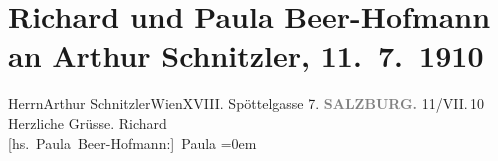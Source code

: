 

         
         \renewcommand{\erwaehntePersonen}{Personen: Richard Beer-Hofmann, Paula Beer-Hofmann}
         \renewcommand{\erwaehnteOrte}{Orte: Edmund-Weiß-Gasse, Salzburg, Wien}
         \renewcommand{\erwaehnteWerke}{}
               \section[Richard und Paula Beer-Hofmann an Arthur Schnitzler, 11. 7. 1910]{ Richard und Paula Beer-Hofmann an Arthur Schnitzler,
               11. 7. 1910}\nopagebreak{}\rehead{ }\begin{ledgroupsized}[t]{13cm}\normalsize\beginnumbering \toendnotes[C]{\smallbreak\pagebreak[2]} 
\pstart{}{\pb}Herrn\pend{}\pstart{}Arthur Schnitzler\pend{}\pstart{}Wien\pend{}\pstart{}XVIII. Spöttelgasse 7.\pend{}{\bigskip}\pstart
           \noindent{}\centering{}{\pb}\textcolor{gray}{\textbf{SALZBURG.}}\pend
           \pstart
           \raggedleft{}{\pb}11/VII. 10\pend
           \pstart
           Herzliche Grüsse.\pend
           \pstart
           \spacefill\mbox{Richard}{\\[\baselineskip]}\spacefill\mbox{{[}hs. Paula Beer-Hofmann:{]} Paula}\pend
           \leftskip=0em{}
         
         \endnumbering{}\end{ledgroupsized}  \newcommand{\dateiname}{L01944}\newcommand{\titel}{Richard und Paula Beer-Hofmann an Arthur Schnitzler, 11. 7. 1910}\newcommand{\editorInnen}{Martin Anton Müller und Gerd-Hermann Susen}
      